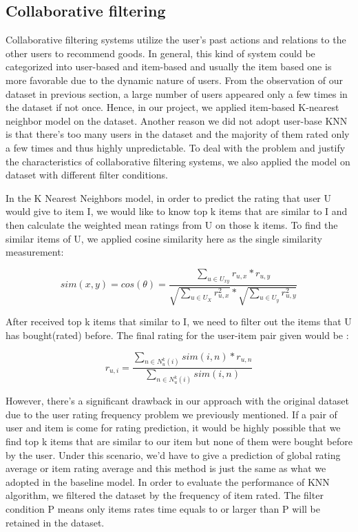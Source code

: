 \documentclass[sigconf]{acmart}
\begin{document}
\subsection{Collaborative filtering}
Collaborative filtering systems utilize the user’s past actions and relations to the other users to recommend goods\cite{si2004unified}. In general, this kind of system could be categorized into user-based and item-based and usually the item based one is more favorable due to the dynamic nature of users\cite{sarwar2001item}. From the observation of our dataset in previous section, a large number of users appeared only a few times in the dataset if not once. Hence, in our project, we applied item-based K-nearest neighbor model on the dataset. Another reason we did not adopt user-base KNN is that there’s too many users in the dataset and the majority of them rated only a few times and thus highly unpredictable. To deal with the problem and justify the characteristics of collaborative filtering systems, we also applied the model on dataset with different filter conditions.

In the K Nearest Neighbors model,  in order to predict the rating that user U would give to item I, we would like to know top k items that are similar to I and then calculate the weighted mean ratings from U on those k items. To find the similar items of U, we applied cosine similarity here as the single similarity measurement:

\begin{equation}
    sim(x, y) = cos(\theta) = \frac{\sum_{u\in U_{xy}}r_{u,x}*r_{u,y}}{\sqrt{\sum_{u \in U_{X}}r^2_{u,x}}*\sqrt{\sum_{u \in 
    U_{y}}r^2_{u,y}}}
\end{equation}

After received top k items that similar to I, we need to filter out the items that U has bought(rated) before. The final rating for the user-item pair given would be :

\begin{equation}
    r_{u,i} = \frac{\sum_{n\in N^k_u(i)}sim(i,n)*r_{u,n}}{\sum_{n\in N^k_u(i)}sim(i,n)}
\end{equation}

However, there’s a significant drawback in our approach with the original dataset due to the user rating frequency problem we previously mentioned. If a pair of user and item is come for rating prediction, it would be highly possible that we find top k items that are similar to our item but none of them were bought before by the user. Under this scenario, we’d have to give a prediction of global rating average or item rating average and this method is just the same as what we adopted in the baseline model. In order to evaluate  the performance of KNN algorithm, we filtered the dataset by the frequency of item rated. The filter condition P means only items rates time equals to or larger than P will be retained in the dataset.
\end{document}
